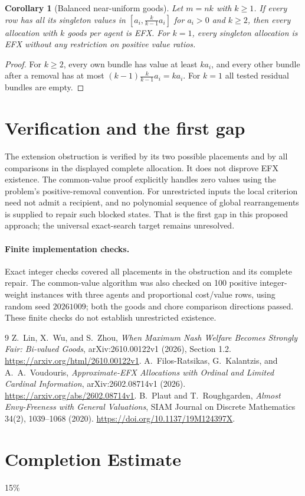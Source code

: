 \documentclass[11pt]{article}
\newtheorem{corollary}[theorem]{Corollary}
\theoremstyle{definition}
\begin{document}
\begin{corollary}[Balanced near-uniform goods]
Let $m=nk$ with $k\geq1$. If every row has all its singleton values in
$[a_i,\frac{k}{k-1}a_i]$ for $a_i>0$ and $k\geq2$, then every allocation
with $k$ goods per agent is EFX. For $k=1$, every singleton allocation is EFX
without any restriction on positive value ratios.
\end{corollary}
\begin{proof}
For $k\geq2$, every own bundle has value at least $ka_i$, and every other
bundle after a removal has at most $(k-1)\frac{k}{k-1}a_i=ka_i$.
For $k=1$ all tested residual bundles are empty.
\end{proof}

\section{Verification and the first gap}
The extension obstruction is verified by its two possible placements and by
all comparisons in the displayed complete allocation. It does not disprove
EFX existence. The common-value proof explicitly handles zero values using the
problem's positive-removal convention. For unrestricted inputs the local
criterion need not admit a recipient, and no polynomial sequence of global
rearrangements is supplied to repair such blocked states. That is the first gap
in this proposed approach; the universal exact-search target remains unresolved.

\paragraph{Finite implementation checks.}
Exact integer checks covered all placements in the obstruction and its
complete repair. The common-value algorithm was also checked on 100 positive
integer-weight instances with three agents and proportional cost/value rows,
using random seed $20261009$; both the goods and chore comparison directions
passed. These finite checks do not establish unrestricted existence.

\begin{thebibliography}{9}
 Z.~Lin, X.~Wu, and S.~Zhou,
\emph{When Maximum Nash Welfare Becomes Strongly Fair: Bi-valued Goods},
arXiv:2610.00122v1 (2026), Section 1.2.
\url{https://arxiv.org/html/2610.00122v1}.
 A.~Filos-Ratsikas, G.~Kalantzis, and A.~A.~Voudouris,
\emph{Approximate-EFX Allocations with Ordinal and Limited Cardinal Information},
arXiv:2602.08714v1 (2026).
\url{https://arxiv.org/abs/2602.08714v1}.
 B.~Plaut and T.~Roughgarden,
\emph{Almost Envy-Freeness with General Valuations}, SIAM Journal on Discrete
Mathematics 34(2), 1039--1068 (2020).
\url{https://doi.org/10.1137/19M124397X}.
\end{thebibliography}

\section{Completion Estimate}
15\%
\end{document}

